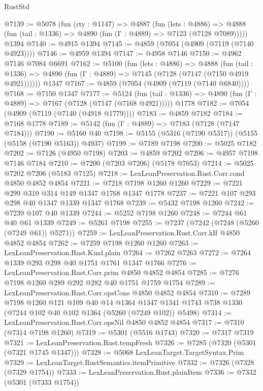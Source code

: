 \begin{lexlean}{RustStd}
\begin{coremodule}
@7139 := @5078
    (fun (rty : @1147) =>
    @4887
      (fun (lets : @4886) =>
      @4888 (fun (tail : @1336) => @4890 (fun (Γ : @4889) => @7123 (@7128 @7089)))))
    @1394
@7140 := @4915 @1394
@7145 := @4859 (@7054 (@4909 (@7119 (@7140 @4923))))
@7146 := @4959 @1394
@7147 := @4958 @7146
@7150 := @4962 @7146 @7084 @6691
@7162 := @5100
    (fun (lets : @4886) =>
    @4888
      (fun (tail : @1336) => @4890 (fun (Γ : @4889) => @7145 (@7128 (@7147 (@7150 @4919 @4921))))))
    @1347
@7167 := @4859 (@7054 (@4909 (@7119 (@7140 @6840))))
@7168 := @7150 @1347
@7177 := @5124
    (fun (tail : @1336) => @4890 (fun (Γ : @4889) => @7167 (@7128 (@7147 (@7168 @4921)))))
    @1778
@7182 := @7054 (@4909 (@7119 (@7140 (@4918 @1779))))
@7183 := @4859 @7182
@7184 := @7168 @1778
@7189 := @5142 (fun (Γ : @4889) => @7183 (@7128 (@7147 @7184)))
@7190 := @5160 @40
@7198 := @5155 (@5316 (@7190 @5317)) (@5155 (@5158 (@7190 @5163)) @4937)
@7199 := @7189 @7198
@7200 := @5025 @7182
@7202 := @7126 (@4950 @7198)
@7203 := @4859 @7202
@7206 := @4957 @7198 @7146 @7184
@7210 := @7200 (@7203 @7206) (@5178 @7053)
@7214 := @5025 @7202 @7206 (@5183 @7125)
@7218 := LexLeanPreservation.Rust.Corr.cond @4850 @4852 @4854
@7221 := @7218 @7198 @1260 @1260
@7229 := @7221 @299 @310 @314 @149 @1347 @1768 @1347 @1778
@7237 := @7221 @107 @293 @298 @40 @1347 @1339 @1347 @1768
@7239 := @5432 @7198 @1260
@7242 := @7239 @107 @40 @1339
@7244 := @5252 @7198 @1260
@7248 := @7244 @61 @40 @61 @1339
@7249 := @5261 @7198
@7255 := @7237 (@7242 (@7248 (@5260 (@7249 @61)) @5271))
@7259 := LexLeanPreservation.Rust.Corr.kIf @4850 @4852 @4854
@7262 := @7259 @7198 @1260 @1260
@7263 := LexLeanPreservation.Rust.Kind.plain
@7264 := @7262 @7263
@7272 := @7264 @1339 @293 @298 @40 @1751 @1761 @1347 @1766
@7276 := LexLeanPreservation.Rust.Corr.prim @4850 @4852 @4854
@7285 := @7276 @7198 @1260 @289 @292 @282 @40 @1751 @1759 @1754
@7289 := LexLeanPreservation.Rust.Corr.opsCons @4850 @4852 @4854
@7310 := @7289
    @7198
    @1260
    @121
    @109
    @40
    @14
    @1364
    @1347
    @1341
    @1743
    @738
    @1330
    (@7244 @102 @40 @102 @1364 (@5260 (@7249 @102)) @5498)
@7314 := LexLeanPreservation.Rust.Corr.opsNil @4850 @4852 @4854
@7317 := @7310 (@7314 @7198 @1260)
@7319 := @5301 (@5516 @1743)
@7320 := @7317 @7319
@7321 := LexLeanPreservation.Rust.tempFresh
@7326 := @7285 (@7320 (@5301 (@7321 @1745 @1347)))
@7328 := @5068 LexLeanTarget.TargetSyntax.Prim
@7329 := LexLeanTarget.RustSemantics.itemPrimitive
@7332 := @7326 (@7328 (@7329 @1754))
@7333 := LexLeanPreservation.Rust.plainItem
@7336 := @7332 (@5301 (@7333 @1754))

\end{coremodule}
\end{lexlean}
